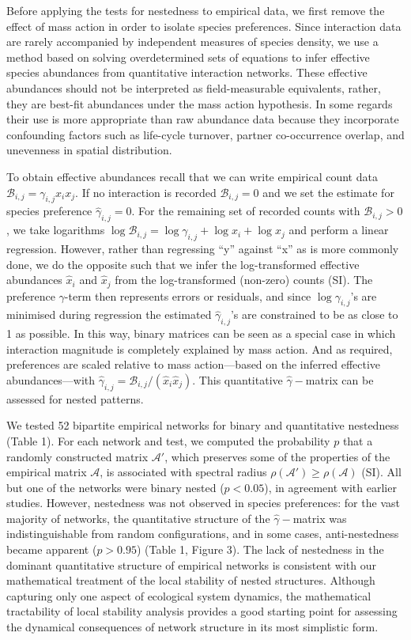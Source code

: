 \documentclass[pdftex]{nature}
\begin{document}
Before applying the tests for nestedness to empirical data, we first
remove the effect of mass action in order to isolate species
preferences.  Since interaction data are rarely accompanied by
independent measures of species density, we use a method based on
solving overdetermined sets of equations\cite{pseudoinverse} to infer
effective species abundances from quantitative interaction networks.
These effective abundances should not be interpreted as
field-measurable equivalents, rather, they are best-fit abundances
under the mass action hypothesis. In some regards their use is more
appropriate than raw abundance data because they incorporate
confounding factors such as life-cycle turnover, partner co-occurrence
overlap, and unevenness in spatial distribution.

To obtain effective abundances recall that we can write empirical
count data $\mathcal B_{i,j} = \gamma_{i,j} x_i x_j$.  If no
interaction is recorded $\mathcal B_{i,j} = 0$ and we set the estimate
for species preference $\hat{\gamma}_{i,j} = 0$.  For the remaining
set of recorded counts with $\mathcal B_{i,j} > 0$, we take logarithms
$\log \mathcal B_{i,j} = \log \gamma_{i,j} + \log x_i + \log x_j$ and
perform a linear regression. However, rather than regressing ``y''
against ``x'' as is more commonly done, we do the opposite such that
we infer the log-transformed effective abundances $\hat{x}_i$ and
$\hat{x}_j$ from the log-transformed (non-zero) counts (SI).  The
preference $\gamma$-term then represents errors or residuals, and
since $\log \gamma_{i,j}$'s are minimised during regression the
estimated $\hat{\gamma}_{i,j}$'s are constrained to be as close to 1
as possible.  In this way, binary matrices can be seen as a special
case in which interaction magnitude is completely explained by mass
action.  And as required, preferences are scaled relative to mass
action---based on the inferred effective abundances---with
$\hat{\gamma}_{i,j} = \mathcal B_{i,j}/(\hat{x}_i \hat{x}_j)$.  This
quantitative $\hat{\gamma}-$matrix can be assessed for nested
patterns.


We tested 52 bipartite empirical networks for binary and quantitative
nestedness (Table 1).  For each network and test, we computed the
probability $p$ that a randomly constructed matrix $\mathcal A'$,
which preserves some of the properties of the empirical matrix
$\mathcal A$, is associated with spectral radius $\rho(\mathcal A')
\ge \rho(\mathcal A)$ (SI).  All but one of the networks were binary
nested ($p<0.05$), in agreement with earlier
studies\cite{BascompteNestedness}.  However, nestedness was not
observed in species preferences: for the vast majority of networks,
the quantitative structure of the $\hat{\gamma}-$matrix was
indistinguishable from random configurations, and in some cases,
anti-nestedness became apparent ($p>0.95$) (Table 1, Figure 3).  The
lack of nestedness in the dominant quantitative structure of empirical
networks is consistent with our mathematical treatment of the local
stability of nested structures.  Although capturing only one aspect of
ecological system dynamics, the mathematical tractability of local
stability analysis provides a good starting point for assessing the
dynamical consequences of network structure in its most simplistic
form\cite{StabilityCriteria}.
\end{document}
